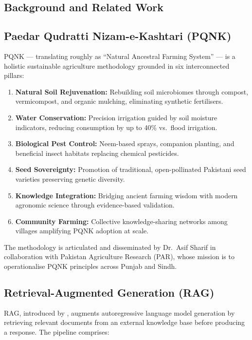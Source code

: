 \documentclass[12pt, a4paper]{article}
\begin{document}
\begin{onehalfspacing}
\section{Background and Related Work}

\subsection{Paedar Qudratti Nizam-e-Kashtari (PQNK)}

PQNK --- translating roughly as ``Natural Ancestral Farming System'' --- is a
holistic sustainable agriculture methodology grounded in six interconnected pillars:

\begin{enumerate}[noitemsep]
  \item \textbf{Natural Soil Rejuvenation:} Rebuilding soil microbiomes through
    compost, vermicompost, and organic mulching, eliminating synthetic fertilisers.
  \item \textbf{Water Conservation:} Precision irrigation guided by soil moisture
    indicators, reducing consumption by up to 40\% vs.\ flood irrigation.
  \item \textbf{Biological Pest Control:} Neem-based sprays, companion planting,
    and beneficial insect habitats replacing chemical pesticides.
  \item \textbf{Seed Sovereignty:} Promotion of traditional, open-pollinated
    Pakistani seed varieties preserving genetic diversity.
  \item \textbf{Knowledge Integration:} Bridging ancient farming wisdom with
    modern agronomic science through evidence-based validation.
  \item \textbf{Community Farming:} Collective knowledge-sharing networks among
    villages amplifying PQNK adoption at scale.
\end{enumerate}

The methodology is articulated and disseminated by Dr.~Asif Sharif in collaboration
with Pakistan Agriculture Research (PAR), whose mission is to operationalise
PQNK principles across Punjab and Sindh.

\subsection{Retrieval-Augmented Generation (RAG)}

RAG, introduced by \citet{lewis2020rag}, augments autoregressive language model
generation by retrieving relevant documents from an external knowledge base before
producing a response. The pipeline comprises:


\end{onehalfspacing}
\end{document}
